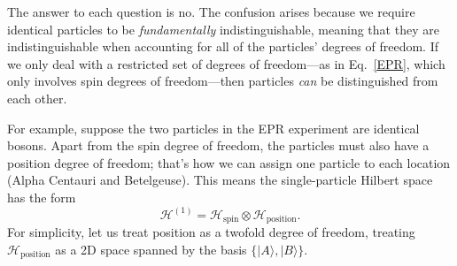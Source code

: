 \documentclass[prx,12pt]{revtex4-2}
\begin{document}
The answer to each question is no.  The confusion arises because we
require identical particles to be \textit{fundamentally}
indistinguishable, meaning that they are indistinguishable when
accounting for all of the particles' degrees of freedom.  If we only
deal with a restricted set of degrees of freedom---as in
Eq.~\eqref{EPR}, which only involves spin degrees of freedom---then
particles \textit{can} be distinguished from each other.

For example, suppose the two particles in the EPR experiment are
identical bosons.  Apart from the spin degree of freedom, the
particles must also have a position degree of freedom; that's how we
can assign one particle to each location (Alpha Centauri and
Betelgeuse).  This means the single-particle Hilbert space has the
form
\begin{equation}
  \mathscr{H}^{(1)} = \mathscr{H}_{\mathrm{spin}} \otimes \mathscr{H}_{\mathrm{position}}.
\end{equation}
For simplicity, let us treat position as a twofold degree of freedom,
treating $\mathscr{H}_{\mathrm{position}}$ as a 2D space spanned by
the basis $\{|A\rangle, |B\rangle\}$.
\end{document}
